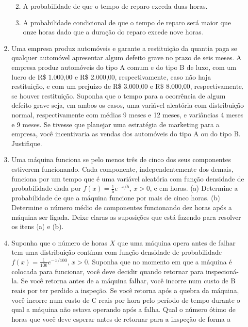 \documentclass[
  10pt,
]{article}
\providecommand{\tightlist}{%
  \setlength{\itemsep}{0pt}\setlength{\parskip}{0pt}}
\begin{document}
\begin{enumerate}
  \begin{enumerate}
  \def\labelenumii{(\alph{enumii})}
  \tightlist
  \item
    A probabilidade de que o tempo de reparo exceda duas horas.
  \item
    A probabilidade condicional de que o tempo de reparo será maior que
    onze horas dado que a duração do reparo excede nove horas.
  \end{enumerate}
\item
  Uma empresa produz automóveis e garante a restituição da quantia paga
  se qualquer automóvel apresentar algum defeito grave no prazo de seis
  meses. A empresa produz automóveis do tipo A comum e do tipo B de
  luxo, com um lucro de R\$ 1.000,00 e R\$ 2.000,00, respectivamente,
  caso não haja restituição, e com um prejuízo de R\$ 3.000,00 e R\$
  8.000,00, respectivamente, se houver restituição. Suponha que o tempo
  para a ocorrência de algum defeito grave seja, em ambos os casos, uma
  variável aleatória com distribuição normal, respectivamente com médias
  9 meses e 12 meses, e variâncias 4 meses e 9 meses. Se tivesse que
  planejar uma estratégia de marketing para a empresa, você incentivaria
  as vendas dos automóveis do tipo A ou do tipo B. Justifique.
\item
  Uma máquina funciona se pelo menos três de cinco dos seus componentes
  estiverem funcionando. Cada componente, independentemente dos demais,
  funciona por um tempo que é uma variável aleatória com função
  densidade de probabilidade dada por \(f(x) = \frac{1}{5}e^{-x/5}\),
  \(x > 0\), e em horas. (a) Determine a probabilidade de que a máquina
  funcione por mais de cinco horas. (b) Determine o número médio de
  componentes funcionando dez horas após a máquina ser ligada. Deixe
  claras as suposições que está fazendo para resolver os itens (a) e
  (b).
\item
  Suponha que o número de horas \(X\) que uma máquina opera antes de
  falhar tem uma distribuição contínua com função densidade de
  probabilidade \(f(x) = \frac{1}{100}e^{-x/100}\), \(x > 0\). Suponha
  que no momento em que a máquina é colocada para funcionar, você deve
  decidir quando retornar para inspecioná-la. Se você retorna antes de a
  máquina falhar, você incorre num custo de B reais por ter perdido a
  inspeção. Se você retorna após a quebra da máquina, você incorre num
  custo de C reais por hora pelo período de tempo durante o qual a
  máquina não estava operando após a falha. Qual o número ótimo de horas
  que você deve esperar antes de retornar para a inspeção de forma a

\end{enumerate}
\end{document}
